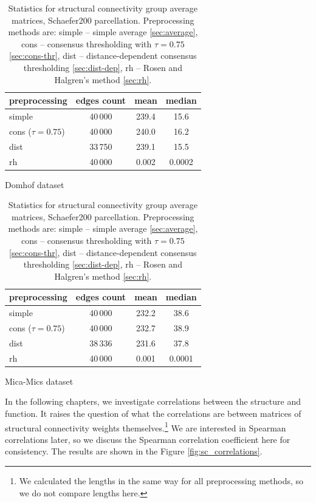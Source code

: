 \begin{table}[h!]
\begin{subtable}{\textwidth}
    \centering
    \begin{tabular}{l | c | c | c }
        preprocessing & edges count & mean	& median\\
        \midrule
        simple             &40\,000  &239.4  &15.6	\\
        cons ($\tau=0.75$) &40\,000	&240.0	&16.2	\\
        dist               &33\,750	&239.1	&15.5	\\
        rh                 &40\,000	&0.002	&0.0002 \\
    \end{tabular}
    \caption{Domhof dataset}
    \label{tab:sc_stats_domhof}
\end{subtable}

\bigskip

\begin{subtable}{\textwidth}
    \centering
    \begin{tabular}{l | c | c | c }
        preprocessing & edges count & mean	& median\\
        \midrule
        simple             &40\,000  &232.2	&38.6	\\
        cons ($\tau=0.75$) &40\,000	&232.7	&38.9	\\
        dist               &38\,336	&231.6	&37.8	\\
        rh                 &40\,000	&0.001	&0.0001 \\
    \end{tabular}
    \caption{Mica-Mics dataset}
    \label{tab:sc_stats_mica}
\end{subtable}
    \caption[Statistics for structural connectivity group average matrices]{Statistics for structural connectivity group average matrices, Schaefer200 parcellation. Preprocessing methods are: simple -- simple average \ref{sec:average}, cons -- consensus thresholding with $\tau=0.75$ \ref{sec:cons-thr}, dist -- distance-dependent consensus thresholding \ref{sec:dist-dep}, rh -- Rosen and Halgren's method \ref{sec:rh}. }
    \label{tab:sc_stats}
\end{table}

In the following chapters, we investigate correlations between the structure and function. It raises the question of what the correlations are between matrices of structural connectivity weights themselves.\footnote{We calculated the lengths in the same way for all preprocessing methods, so we do not compare lengths here.} We are interested in Spearman correlations later, so we discuss the Spearman correlation coefficient here for consistency. The results are shown in the Figure \ref{fig:sc_correlations}. 

